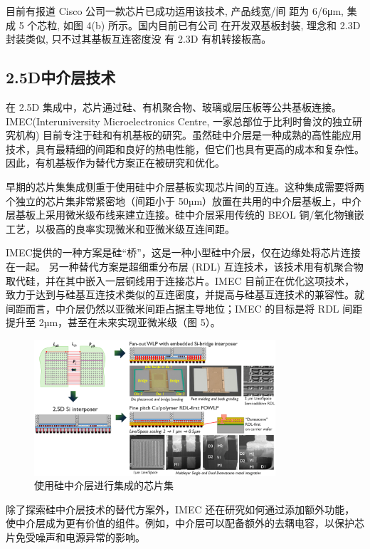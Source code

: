 目前有报道 Cisco 公司一款芯片已成功运用该技术, 产品线宽/间 距为 6/6μm, 集成 5 个芯粒, 如图 4(b) 
所示。国内目前已有公司 在开发双基板封装, 理念和 2.3D 封装类似, 只不过其基板互连密度没 有 2.3D 有机转接板高。

\subsection{2.5D中介层技术}
在 2.5D 集成中，芯片通过硅、有机聚合物、玻璃或层压板等公共基板连接。IMEC(Interuniversity Microelectronics Centre, 一家总部位于比利时鲁汶的独立研究机构)  目前专注于硅和有机基板的研究。虽然硅中介层是一种成熟的高性能应用技术，具有最精细的间距和良好的热电性能，但它们也具有更高的成本和复杂性。因此，有机基板作为替代方案正在被研究和优化。

早期的芯片集集成侧重于使用硅中介层基板实现芯片间的互连。这种集成需要将两个独立的芯片集非常紧密地（间距小于 50µm）放置在共用的中介层基板上，中介层基板上采用微米级布线来建立连接。硅中介层采用传统的 BEOL 铜/氧化物镶嵌工艺，以极高的良率实现微米和亚微米级互连间距。

IMEC提供的一种方案是硅“桥”，这是一种小型硅中介层，仅在边缘处将芯片连接在一起。
另一种替代方案是超细重分布层 (RDL) 互连技术，该技术用有机聚合物取代硅，并在其中嵌入一层铜线用于连接芯片。IMEC 目前正在优化这项技术，致力于达到与硅基互连技术类似的互连密度，并提高与硅基互连技术的兼容性。就间距而言，中介层仍然以亚微米间距占据主导地位；IMEC 的目标是将 RDL 间距提升至 2µm，甚至在未来实现亚微米级（图 5）。

\begin{figure}[htbp]
	\centering
	\includegraphics[width=0.8\textwidth]{img/2.-silicon-interposer-tech2.png} %
	\caption{使用硅中介层进行集成的芯片集 \cite{Beyne2024Chiplet}}
	\label{fig:example}
\end{figure}

除了探索硅中介层技术的替代方案外，IMEC 还在研究如何通过添加额外功能，使中介层成为更有价值的组件。例如，中介层可以配备额外的去耦电容，以保护芯片免受噪声和电源异常的影响。


